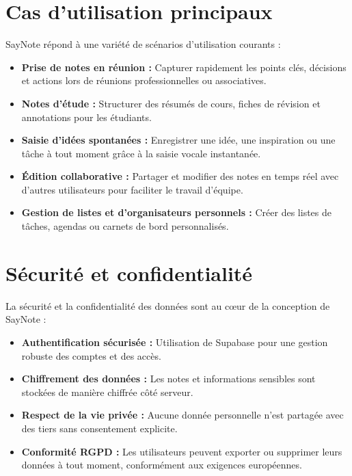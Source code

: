 \section{Cas d’utilisation principaux}
SayNote répond à une variété de scénarios d’utilisation courants :
\begin{itemize}
    \item \textbf{Prise de notes en réunion :} Capturer rapidement les points clés, décisions et actions lors de réunions professionnelles ou associatives.
    \item \textbf{Notes d’étude :} Structurer des résumés de cours, fiches de révision et annotations pour les étudiants.
    \item \textbf{Saisie d’idées spontanées :} Enregistrer une idée, une inspiration ou une tâche à tout moment grâce à la saisie vocale instantanée.
    \item \textbf{Édition collaborative :} Partager et modifier des notes en temps réel avec d’autres utilisateurs pour faciliter le travail d’équipe.
    \item \textbf{Gestion de listes et d’organisateurs personnels :} Créer des listes de tâches, agendas ou carnets de bord personnalisés.
\end{itemize}

\section{Sécurité et confidentialité}
La sécurité et la confidentialité des données sont au cœur de la conception de SayNote :
\begin{itemize}
    \item \textbf{Authentification sécurisée :} Utilisation de Supabase pour une gestion robuste des comptes et des accès.
    \item \textbf{Chiffrement des données :} Les notes et informations sensibles sont stockées de manière chiffrée côté serveur.
    \item \textbf{Respect de la vie privée :} Aucune donnée personnelle n’est partagée avec des tiers sans consentement explicite.
    \item \textbf{Conformité RGPD :} Les utilisateurs peuvent exporter ou supprimer leurs données à tout moment, conformément aux exigences européennes.
\end{itemize}

